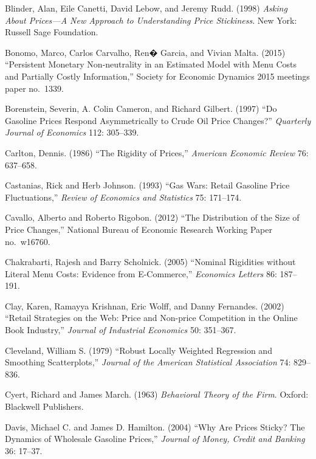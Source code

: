 \documentclass[11pt]{article}
\begin{document}
\begin{description}
\item Blinder, Alan, Eile Canetti, David Lebow, and Jeremy
  Rudd. (1998) {\it Asking About Prices---A New Approach to
    Understanding Price Stickiness}.  New York: Russell Sage
  Foundation.

\item Bonomo, Marco, Carlos Carvalho, Ren� Garcia, and Vivian
  Malta. (2015) ``Persistent Monetary Non-neutrality in an Estimated
  Model with Menu Costs and Partially Costly Information,'' Society
  for Economic Dynamics 2015 meetings paper no.~1339.

\item Borenstein, Severin, A. Colin Cameron, and Richard
  Gilbert. (1997) ``Do Gasoline Prices Respond Asymmetrically to Crude
  Oil Price Changes?'' {\it Quarterly Journal of Economics} 112:
  305--339.

\item Carlton, Dennis. (1986) ``The Rigidity of Prices,'' {\it
  American Economic Review} 76: 637--658.

\item Castanias, Rick and Herb Johnson. (1993) ``Gas Wars: Retail
  Gasoline Price Fluctuations,'' {\it Review of Economics and
    Statistics} 75: 171--174.

\item Cavallo, Alberto and Roberto Rigobon. (2012) ``The Distribution
  of the Size of Price Changes,'' National Bureau of Economic Research
  Working Paper no.~w16760.

\item Chakrabarti, Rajesh and Barry Scholnick. (2005) ``Nominal
  Rigidities without Literal Menu Costs: Evidence from E-Commerce,''
  {\it Economics Letters} 86: 187--191.

\item Clay, Karen, Ramayya Krishnan, Eric Wolff, and Danny
  Fernandes. (2002) ``Retail Strategies on the Web: Price and
  Non-price Competition in the Online Book Industry,'' {\it Journal of
    Industrial Economics} 50: 351--367.

\item Cleveland, William S. (1979) ``Robust Locally Weighted Regression and Smoothing Scatterplots,'' {\em Journal of the American Statistical Association} 74: 829--836.

\item Cyert, Richard and James March. (1963) {\it Behavioral Theory of
  the Firm}.  Oxford: Blackwell Publishers.

\item Davis, Michael C. and James D. Hamilton. (2004) ``Why Are Prices
  Sticky? The Dynamics of Wholesale Gasoline Prices,'' {\it Journal of
    Money, Credit and Banking} 36: 17--37. 


\end{description}
\end{document}

